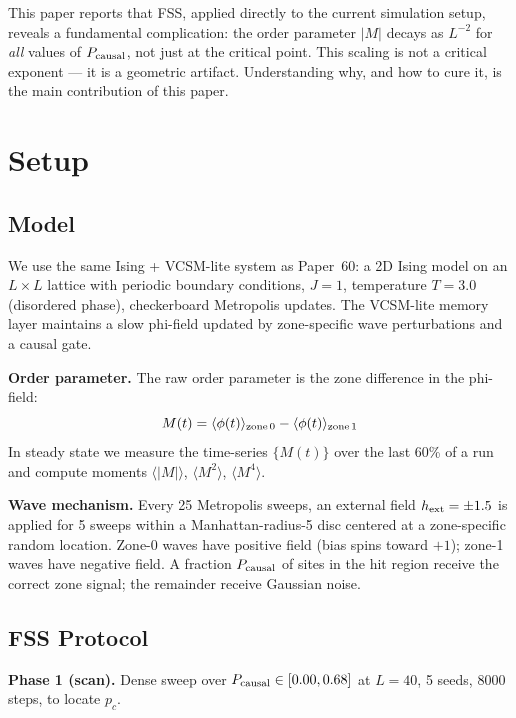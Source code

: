 \documentclass[12pt,a4paper]{article}
\begin{document}
This paper reports that FSS, applied directly to the current simulation setup,
reveals a fundamental complication: the order parameter $|M|$ decays as $L^{-2}$
for \emph{all} values of $P_{\rm causal}$, not just at the critical point.
This scaling is not a critical exponent --- it is a geometric artifact.
Understanding why, and how to cure it, is the main contribution of this paper.

\section{Setup}
\label{sec:setup}

\subsection{Model}

We use the same Ising + VCSM-lite system as Paper~60:
a 2D Ising model on an $L \times L$ lattice with periodic boundary conditions,
$J = 1$, temperature $T = 3.0$ (disordered phase), checkerboard Metropolis updates.
The VCSM-lite memory layer maintains a slow phi-field updated by zone-specific
wave perturbations and a causal gate.

\textbf{Order parameter.}
The raw order parameter is the zone difference in the phi-field:
\begin{equation}
  M(t) = \langle \phi(t) \rangle_{\rm zone\,0} - \langle \phi(t) \rangle_{\rm zone\,1}
\end{equation}
In steady state we measure the time-series $\{M(t)\}$ over the last 60\% of a run
and compute moments $\langle |M| \rangle$, $\langle M^2 \rangle$, $\langle M^4 \rangle$.

\textbf{Wave mechanism.}
Every 25 Metropolis sweeps, an external field $h_{\rm ext} = \pm 1.5$
is applied for 5 sweeps within a Manhattan-radius-5 disc centered at a
zone-specific random location.
Zone-0 waves have positive field (bias spins toward $+1$);
zone-1 waves have negative field.
A fraction $P_{\rm causal}$ of sites in the hit region receive the correct zone signal;
the remainder receive Gaussian noise.

\subsection{FSS Protocol}

\textbf{Phase 1 (scan).} Dense sweep over $P_{\rm causal} \in [0.00, 0.68]$ at $L = 40$,
5 seeds, 8000 steps, to locate $p_c$.
\end{document}

